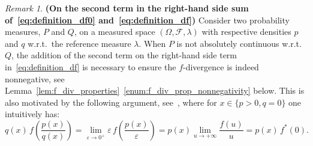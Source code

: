 \documentclass[12pt]{article}
\newcommand{\cf}{{\mathcal F}}
\theoremstyle{plain}
\theoremstyle{remark}
\newtheorem{rem}{Remark}
\begin{document}
\begin{rem}{\bf (On the second term in the right-hand side sum
  of~\eqref{eq:definition_df0} and~\eqref{eq:definition_df}) } 
Consider  two probability measures, $P$ and
$Q$, on a measured space $(\Omega,\cf,\lambda)$ with respective  densities  $p$ and $q$ w.r.t.\ the reference measure $\lambda$.
When $P$ is not absolutely continuous w.r.t.\ $Q$, the
addition of the second term on the right-hand side term in~\eqref{eq:definition_df}
is necessary to ensure the $f$-divergence is indeed
nonnegative, see Lemma~\ref{lem:f_div_properties}~\ref{enum:f_div_prop_nonnegativity}
below. This is also motivated by the following argument,
see~\cite{csiszar1964informationstheoretische}, where
for $x\in \{p>0, q=0\}$ one intuitively has:
\[
q(x) \, f\left( \frac{p(x)}{q(x)}\right) = \lim_{\varepsilon \to 0^+}
\varepsilon \, f\left( \frac{p(x)}{\varepsilon}\right) = p(x) \lim_{u
  \to +\infty} \frac{f(u)}{u} = p(x) \, f^*(0).
\]
\end{rem}
\end{document}
